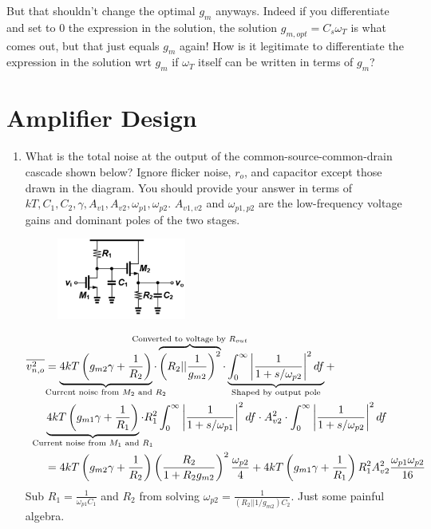 But that shouldn't change the optimal $g_m$ anyways. Indeed if you differentiate and set to 0 the expression in the solution, the solution $g_{m,opt} = C_s \omega_T$ is what comes out, but that just equals $g_m$ again! How is it legitimate to differentiate the expression in the solution wrt $g_m$ if $\omega_T$ itself can be written in terms of $g_m$?

\section{Amplifier Design}
\begin{enumerate}[label=(\alph*)]
  \item {\color{blue}What is the total noise at the output of the common-source-common-drain cascade shown below? Ignore flicker noise, $r_o$, and capacitor except those drawn in the diagram. You should provide your answer in terms of $kT, C_1, C_2, \gamma, A_{v1}, A_{v2}, \omega_{p1}, \omega_{p2}$. $A_{v1,v2}$ and $\omega_{p1,p2}$ are the low-frequency voltage gains and dominant poles of the two stages.}

  \begin{figure}[H]
    \centering
    \includegraphics[width=0.4\textwidth]{figs/problem2.png}
  \end{figure}
  \begin{align*}
    \overline{v_{n,o}^2} &= \underbrace{4kT \left(g_{m2} \gamma + \frac{1}{R_2}\right)}_{\mathclap{\text{Current noise from }M_2 \text{ and } R_2}} \cdot
      \overbrace{\left(R_2 || \frac{1}{g_{m2}} \right)^2}^{\mathclap{\text{Converted to voltage by } R_{out}}} \cdot
      \underbrace{\int_{0}^{\infty} \left| \frac{1}{1 + s / \omega_{p2}} \right|^2 df}_{\mathclap{\text{Shaped by output pole}}} +\\
      &\underbrace{4kT \left(g_{m1} \gamma + \frac{1}{R_1}\right)}_{\mathclap{\text{Current noise from }M_1 \text{ and } R_1}} \cdot
      R_1^2 \int_{0}^{\infty} \left| \frac{1}{1 + s / \omega_{p1}} \right|^2 df \cdot A_{v2}^2 \cdot \int_0^{\infty} \left| \frac{1}{1 + s / \omega_{p2}} \right|^2 df \\
    &= 4 kT \left(g_{m2} \gamma + \frac{1}{R_2}\right) \left(\frac{R_2}{1 + R_2 g_{m2}}\right)^2 \frac{\omega_{p2}}{4} +
      4kT \left(g_{m1} \gamma + \frac{1}{R_1}\right) R_1^2 A_{v2}^2 \frac{\omega_{p1} \omega_{p2}}{16}
  \end{align*}
    Sub $R_1 = \frac{1}{\omega_{p1} C_1}$ and $R_2$ from solving $\omega_{p2} = \frac{1}{(R_2 || 1/g_{m2}) C_2}$. Just some painful algebra.


\end{enumerate}
